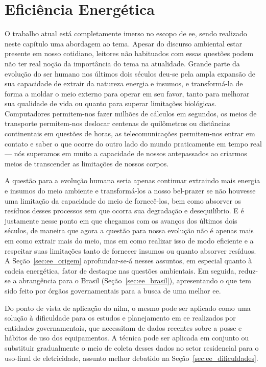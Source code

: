 \chapter{Eficiência Energética}
\label{chap:ee}
\glsresetall

O trabalho atual está completamente imerso no escopo de \gls{ee},
sendo realizado neste capítulo uma abordagem ao tema. Apesar do
discurso ambiental estar presente em nosso cotidiano, leitores não
habituados com essas questões podem não ter real noção da importância
do tema na atualidade. Grande parte da evolução do ser humano nos
últimos dois séculos deu-se pela ampla expansão de sua capacidade de
extrair da natureza energia e insumos, e transformá-la de
forma a moldar o meio externo para operar em seu favor, tanto para
melhorar sua qualidade de vida ou quanto para superar limitações
biológicas. Computadores permitem-nos fazer milhões de cálculos em
segundos, os meios de transporte permitem-nos deslocar centenas de
quilômetros ou distâncias continentais em questões de horas, as
telecomunicações permitem-nos entrar em contato e saber o que ocorre
do outro lado do mundo praticamente em tempo real --- nós superamos em
muito a capacidade de nossos antepassados ao criarmos meios de
transcender as limitações de nossos corpos. 

A questão para a evolução humana seria apenas continuar extraindo mais
energia e insumos do meio ambiente e transformá-los a nosso bel-prazer
se não houvesse uma limitação da capacidade do meio de fornecê-los,
bem como absorver os resíduos desses processos sem que ocorra sua
degradação e desequilíbrio. E é justamente nesse ponto em que chegamos
com os avanços dos últimos dois séculos, de maneira que agora a
questão para nossa evolução não é apenas mais em como extrair mais do
meio, mas em como realizar isso de modo eficiente e a respeitar suas
limitações tanto de fornecer insumos ou quanto absorver resíduos. A
Seção~\ref{sec:ee_origem} aprofundar-se-á nesses assuntos, em especial
quanto à cadeia energética, fator de destaque nas questões ambientais.
Em seguida, reduz-se a abrangência para o Brasil
(Seção~\ref{sec:ee_brasil}), apresentando o que tem sido feito por
órgãos governamentais para a busca de uma melhor \gls{ee}. 

Do ponto de vista de aplicação do \acs{nilm}, o mesmo pode ser
aplicado como uma solução à dificuldade para os estudos e planejamento
em \gls{ee} realizados por entidades governamentais, que
necessitam de dados recentes sobre a posse e hábitos de uso dos
equipamentos. A técnica pode ser aplicada em conjunto ou substituir
gradualmente o meio de coleta desses dados no setor residencial para o
uso-final de eletricidade, assunto melhor debatido na
Seção~\ref{sec:ee_dificuldades}.

